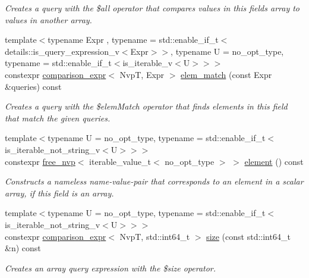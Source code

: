 \begin{DoxyCompactItemize}
\begin{DoxyCompactList}\small\item\em Creates a query with the \$all operator that compares values in this field\textquotesingle{}s array to values in another array. \end{DoxyCompactList}\item 
{\footnotesize template$<$typename Expr , typename  = std\+::enable\+\_\+if\+\_\+t$<$details\+::is\+\_\+query\+\_\+expression\+\_\+v$<$\+Expr$>$$>$, typename U  = no\+\_\+opt\+\_\+type, typename  = std\+::enable\+\_\+if\+\_\+t$<$is\+\_\+iterable\+\_\+v$<$\+U$>$$>$$>$ }\\constexpr \hyperlink{classmangrove_1_1comparison__expr}{comparison\+\_\+expr}$<$ NvpT, Expr $>$ \hyperlink{classmangrove_1_1nvp__base_ad98791cdabcfcc6b9465f48fa434a94c}{elem\+\_\+match} (const Expr \&queries) const 
\begin{DoxyCompactList}\small\item\em Creates a query with the \$elem\+Match operator that finds elements in this field that match the given queries. \end{DoxyCompactList}\item 
{\footnotesize template$<$typename U  = no\+\_\+opt\+\_\+type, typename  = std\+::enable\+\_\+if\+\_\+t$<$is\+\_\+iterable\+\_\+not\+\_\+string\+\_\+v$<$\+U$>$$>$$>$ }\\constexpr \hyperlink{classmangrove_1_1free__nvp}{free\+\_\+nvp}$<$ iterable\+\_\+value\+\_\+t$<$ no\+\_\+opt\+\_\+type $>$ $>$ \hyperlink{classmangrove_1_1nvp__base_a60622c570186d6eac26460bed416ed93}{element} () const 
\begin{DoxyCompactList}\small\item\em Constructs a nameless name-\/value-\/pair that corresponds to an element in a scalar array, if this field is an array. \end{DoxyCompactList}\item 
{\footnotesize template$<$typename U  = no\+\_\+opt\+\_\+type, typename  = std\+::enable\+\_\+if\+\_\+t$<$is\+\_\+iterable\+\_\+not\+\_\+string\+\_\+v$<$\+U$>$$>$$>$ }\\constexpr \hyperlink{classmangrove_1_1comparison__expr}{comparison\+\_\+expr}$<$ NvpT, std\+::int64\+\_\+t $>$ \hyperlink{classmangrove_1_1nvp__base_a18439f708a503f0a8b768e407dbe6ae6}{size} (const std\+::int64\+\_\+t \&n) const 
\begin{DoxyCompactList}\small\item\em Creates an array query expression with the \$size operator. \end{DoxyCompactList}\item 

\end{DoxyCompactItemize}
